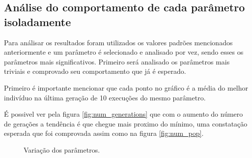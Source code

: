 \documentclass[11pt]{article}
\begin{document}
\subsection{Análise do comportamento de cada parâmetro isoladamente}
\label{sec:orgcf96b8e}
Para análisar os resultados foram utilizados os valores padrões mencionados anteriormente e um parâmetro é selecionado e analisado por vez, sendo esses os parâmetros mais significativos. Primeiro será analisado os parâmetros mais triviais e comprovado seu comportamento que já é esperado.

Primeiro é importante mencionar que cada ponto no gráfico é a média do melhor indivíduo na última geração de 10 execuções do mesmo parâmetro.

É possivel ver pela figura \ref{fig:num_generations} que com o aumento do número de gerações a tendência é que chegue mais proximo do mínimo, uma constatação esperada que foi comprovada assim como na figura \ref{fig:num_pop}.

\begin{figure}[!htb]
	\centering
	\caption{Variação dos parâmetros.}
\end{figure}
\end{document}
